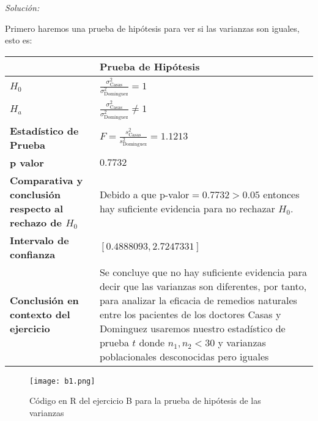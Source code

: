 \documentclass[12pt]{article}
\newenvironment{sol}
    {\emph{Solución:}
    }
    {
    }
\begin{document}
\begin{sol}
Primero haremos una prueba de hipótesis para ver si las varianzas son iguales, esto es:

\begin{table}[h!]
\centering
\begin{tabular}{|>{\raggedright\arraybackslash}m{6cm}|>{\raggedright\arraybackslash}m{6cm}|}
\hline
 & \textbf{Prueba de Hipótesis} \\ \hline
$H_0$ & \vspace{0.5cm}$\frac{\sigma_{\text{Casas}}^2}{\sigma_{\text{Dominguez}
}^2}=1$ \vspace{0.5cm}\\ \hline
$H_a$ & \vspace{0.5cm} $\frac{\sigma_{\text{Casas}}^2}{\sigma_{\text{Dominguez}
}^2}\neq1$ \vspace{0.5cm}\\ \hline
\textbf{Estadístico de Prueba} & \vspace{0.5cm}$F = \frac{s_\text{Casas}^2}{s_\text{Dominguez}^2}=1.1213$\vspace{0.5cm} \\ \hline
\textbf{p valor} & $0.7732$ \\ \hline
\textbf{Comparativa y conclusión respecto al rechazo de $H_0$} & Debido a que p-valor$=0.7732>0.05$ entonces hay suficiente evidencia para no rechazar $H_0$. \\ \hline
\textbf{Intervalo de confianza} & $[0.4888093,2.7247331]$ \\ \hline
\textbf{Conclusión en contexto del ejercicio} & Se concluye que no hay suficiente evidencia para decir que las varianzas son diferentes, por tanto, para analizar la eficacia de remedios naturales entre los pacientes de los doctores Casas y Dominguez usaremos nuestro estadístico de prueba $t$ donde $n_1 ,n_2 < 30$ y varianzas poblacionales desconocidas pero iguales \\ \hline
\end{tabular}
\label{tab:hipotesis}
\end{table}
\pagebreak

\begin{figure}[h]  %
    \centering      %
    \texttt{[image: b1.png]} 
    \caption{Código en R del ejercicio B para la prueba de hipótesis de las varianzas}
\end{figure}


\end{sol}
\end{document}
